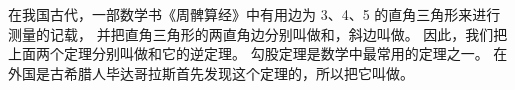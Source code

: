 在我国古代，一部数学书《周髀算经》中有用边为 3、4、5 的直角三角形来进行测量的记载，
并把直角三角形的两直角边分别叫做和，斜边叫做。
因此，我们把上面两个定理分别叫做和它的逆定理。
勾股定理是数学中最常用的定理之一。
在外国是古希腊人毕达哥拉斯首先发现这个定理的，所以把它叫做。


\begin{lianxi}

\begin{xiaoxiaotis}



\end{xiaoxiaotis}




\end{lianxi}

